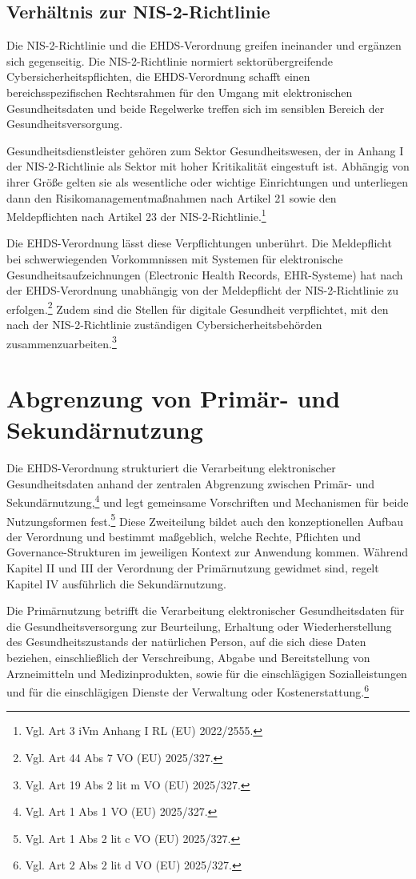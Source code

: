        \subsection{Verhältnis zur NIS-2-Richtlinie}
Die NIS-2-Richtlinie und die EHDS-Verordnung greifen ineinander und ergänzen sich gegenseitig. Die NIS-2-Richtlinie normiert sektorübergreifende Cybersicherheitspflichten, die EHDS-Verordnung schafft einen bereichsspezifischen Rechtsrahmen für den Umgang mit elektronischen Gesundheitsdaten und beide Regelwerke treffen sich im sensiblen Bereich der Gesundheitsversorgung.

Gesundheitsdienstleister gehören zum Sektor Gesundheitswesen, der in Anhang I der NIS-2-Richtlinie als Sektor mit hoher Kritikalität eingestuft ist. Abhängig von ihrer Größe gelten sie als wesentliche oder wichtige Einrichtungen und unterliegen dann den Risikomanagementmaßnahmen nach Artikel 21 sowie den Meldepflichten nach Artikel 23 der NIS-2-Richtlinie.\footnote{Vgl. Art 3 iVm Anhang I RL (EU) 2022/2555.}

Die EHDS-Verordnung lässt diese Verpflichtungen unberührt. Die Meldepflicht bei schwerwiegenden Vorkommnissen mit Systemen für elektronische Gesundheitsaufzeichnungen (Electronic Health Records, EHR-Systeme) hat nach der EHDS-Verordnung  unabhängig von der Meldepflicht der NIS-2-Richtlinie zu erfolgen.\footnote{Vgl. Art 44 Abs 7 VO (EU) 2025/327.} Zudem sind die Stellen für digitale Gesundheit verpflichtet, mit den nach der NIS-2-Richtlinie zuständigen Cybersicherheitsbehörden zusammenzuarbeiten.\footnote{Vgl. Art 19 Abs 2 lit m VO (EU) 2025/327.}


\section{Abgrenzung von Primär- und Sekundärnutzung}
Die EHDS-Verordnung strukturiert die Verarbeitung elektronischer Gesundheitsdaten anhand der zentralen Abgrenzung zwischen Primär- und Sekundärnutzung,\footnote{Vgl. Art 1 Abs 1 VO (EU) 2025/327.} und legt gemeinsame Vorschriften und Mechanismen für beide Nutzungsformen fest.\footnote{Vgl. Art 1 Abs 2 lit c VO (EU) 2025/327.} Diese Zweiteilung bildet auch den konzeptionellen Aufbau der Verordnung und bestimmt maßgeblich, welche Rechte, Pflichten und Governance-Strukturen im jeweiligen Kontext zur Anwendung kommen. Während Kapitel II und III der Verordnung der Primärnutzung gewidmet sind, regelt Kapitel IV ausführlich die Sekundärnutzung.

Die Primärnutzung betrifft die Verarbeitung elektronischer Gesundheitsdaten für die Gesundheitsversorgung zur Beurteilung, Erhaltung oder Wiederherstellung des Gesundheitszustands der natürlichen Person, auf die sich diese Daten beziehen, einschließlich der Verschreibung, Abgabe und Bereitstellung von Arzneimitteln und Medizinprodukten, sowie für die einschlägigen Sozialleistungen und für die einschlägigen Dienste der Verwaltung oder Kostenerstattung.\footnote{Vgl. Art 2 Abs 2 lit d VO (EU) 2025/327.}

